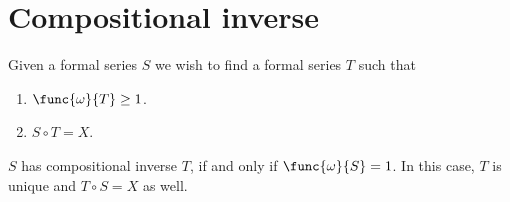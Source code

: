 \section{Compositional inverse}
Given a formal series \(S\) we wish to find a formal series \(T\) such that 
\begin{enumerate}
    \item \(\func{\omega}{T} \geq 1\).
    \item \( S \circ T = X\).
\end{enumerate}

\begin{theorem}
    \(S\) has compositional inverse \(T\), if and only if \(\func{\omega}{S} = 1\). In this case, \(T\) is unique and \(T\circ S = X\) as well.
\end{theorem}
